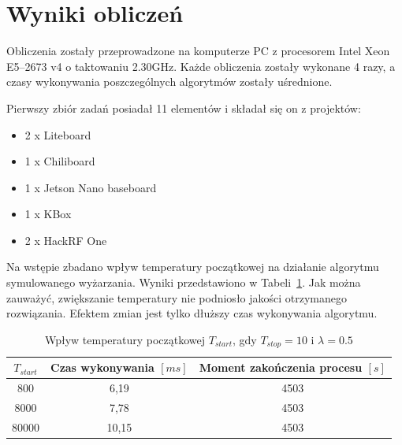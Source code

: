 \section{Wyniki obliczeń}
Obliczenia zostały przeprowadzone na komputerze PC z procesorem Intel Xeon E5--2673 v4 o taktowaniu 2.30GHz.
Każde obliczenia zostały wykonane 4 razy, a czasy wykonywania poszczególnych algorytmów zostały uśrednione.

\newpage{}
\breakparagraph{}
Pierwszy zbiór zadań posiadał 11 elementów i składał się on z projektów:
\begin{itemize}
	\item 2 x Liteboard
	\item 1 x Chiliboard
	\item 1 x Jetson Nano baseboard
	\item 1 x KBox
	\item 2 x HackRF One
\end{itemize}

Na wstępie zbadano wpływ temperatury początkowej na działanie algorytmu symulowanego wyżarzania. Wyniki przedstawiono w Tabeli~\ref{tstart_sa}. Jak można zauważyć, zwiększanie temperatury nie podniosło jakości otrzymanego rozwiązania. Efektem zmian jest tylko dłuższy czas wykonywania algorytmu.

\begin{table}[H]
	\centering
	\caption{Wpływ temperatury początkowej $T_{start}$, gdy $T_{stop}=10$ i $\lambda=0.5$}
	\label{tstart_sa}
	\begin{tabular}{ccc}
		\toprule
		$T_{start}$ & Czas wykonywania $[ms]$ & Moment zakończenia procesu $[s]$ \\
		\midrule
		800         & 6,19                    & 4503                              \\
		8000        & 7,78                    & 4503                              \\
		80000       & 10,15                   & 4503                              \\
		\bottomrule
	\end{tabular}
\end{table}


